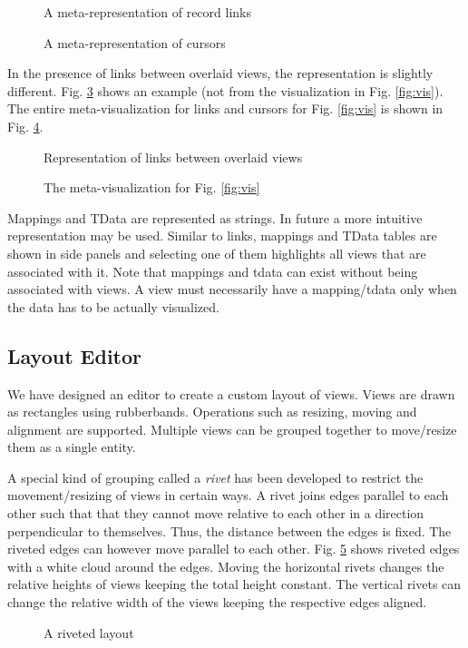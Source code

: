 \begin{figure}[tbp]
\centerline{}
\caption{\label{fig:reclinks}{A meta-representation of record links}}
\end{figure}

\begin{figure}[tbp]
\centerline{}
\caption{\label{fig:viscur}{A meta-representation of cursors}}
\end{figure}

In the presence of links between overlaid views, the representation is
slightly different. Fig. \ref{fig:pilelinks} shows an example (not from
the visualization in Fig. \ref{fig:vis}). The entire meta-visualization
for links and cursors for Fig. \ref{fig:vis} is shown in
Fig. \ref{fig:alllinks}.

\begin{figure}[tbp]
\centerline{}
\caption{\label{fig:pilelinks}{Representation of links between overlaid views}}
\end{figure}

\begin{figure}[tbp]
\centerline{}
\caption{\label{fig:alllinks}{ The meta-visualization for Fig. \ref{fig:vis}}}
\end{figure}

Mappings and TData are represented as strings. In future a more intuitive
representation may be used. Similar to links, mappings and TData
tables are shown in  side panels and selecting one of them highlights
all views that are associated with it. Note that mappings and tdata can
exist without being associated with views. A view must necessarily
have a mapping/tdata only when the data has to be actually visualized.

\subsection{Layout Editor}

We have designed an editor to create a custom layout of views. Views
are drawn as rectangles using rubberbands. Operations such as resizing,
moving and alignment are supported. Multiple views can be grouped together to
move/resize them as a single entity. 

A special kind of grouping called a {\it rivet } has been developed to
restrict the movement/resizing of views in certain ways. A rivet joins
edges parallel to each other such that that they cannot move relative to
each other in a direction perpendicular to themselves.
Thus, the distance between the edges is fixed. The riveted edges can however
move parallel to each other.
Fig. \ref{fig:visrivet} shows riveted edges with a white cloud around the
edges. Moving the horizontal rivets changes the relative heights of views
keeping the total height constant.  The vertical rivets can change the relative
width of the views keeping the respective edges aligned. 

\begin{figure}[tbp]
\centerline{}
\caption{\label{fig:visrivet}{A riveted layout}}
\end{figure}



